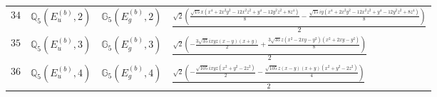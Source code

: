 \documentclass[fleqn,8pt,landscape]{jsarticle}
\begin{document}
\begin{table}[ht!]
\begin{center}
\begin{tabular}{cccl}
$ 34 $ & $ \mathbb{Q}_{5}(E_{u}^{(b)},2) $ & $ \mathbb{G}_{5}(E_{g}^{(b)},2) $ & $ \frac{\sqrt{2} \left(\frac{\sqrt{15} x \left(x^{4} + 2 x^{2} y^{2} - 12 x^{2} z^{2} + y^{4} - 12 y^{2} z^{2} + 8 z^{4}\right)}{8} - \frac{\sqrt{15} i y \left(x^{4} + 2 x^{2} y^{2} - 12 x^{2} z^{2} + y^{4} - 12 y^{2} z^{2} + 8 z^{4}\right)}{8}\right)}{2} $ \\
$ 35 $ & $ \mathbb{Q}_{5}(E_{u}^{(b)},3) $ & $ \mathbb{G}_{5}(E_{g}^{(b)},3) $ & $ \frac{\sqrt{2} \left(- \frac{3 \sqrt{35} i x y z \left(x - y\right) \left(x + y\right)}{2} + \frac{3 \sqrt{35} z \left(x^{2} - 2 x y - y^{2}\right) \left(x^{2} + 2 x y - y^{2}\right)}{8}\right)}{2} $ \\
$ 36 $ & $ \mathbb{Q}_{5}(E_{u}^{(b)},4) $ & $ \mathbb{G}_{5}(E_{g}^{(b)},4) $ & $ \frac{\sqrt{2} \left(- \frac{\sqrt{105} i x y z \left(x^{2} + y^{2} - 2 z^{2}\right)}{2} - \frac{\sqrt{105} z \left(x - y\right) \left(x + y\right) \left(x^{2} + y^{2} - 2 z^{2}\right)}{4}\right)}{2} $ \\
 \hline \hline
\end{tabular}
\end{center}
\end{table}
\end{document}
